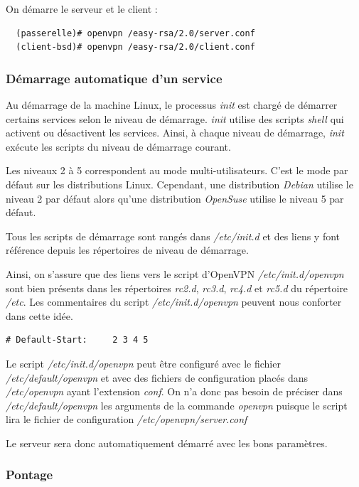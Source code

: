 \documentclass[a4paper]{article}
\begin{document}
On démarre le serveur et le client :
\begin{verbatim}
  (passerelle)# openvpn /easy-rsa/2.0/server.conf
  (client-bsd)# openvpn /easy-rsa/2.0/client.conf
\end{verbatim}

\subsubsection{Démarrage automatique d'un service}

Au démarrage de la machine Linux, le processus \textit{init} 
est chargé de démarrer certains services selon le niveau de démarrage.
\textit{init} utilise des scripts \textit{shell} qui activent ou désactivent
les services. Ainsi, à chaque niveau de démarrage, \textit{init} exécute
les scripts du niveau de démarrage courant.

Les niveaux 2 à 5 correspondent au mode multi-utilisateurs. C'est le mode
par défaut sur les distributions Linux. Cependant, une distribution 
\textit{Debian} utilise le niveau 2 par défaut alors qu'une distribution
\textit{OpenSuse} utilise le niveau 5 par défaut.

Tous les scripts de démarrage sont rangés dans \textit{/etc/init.d} et
des liens y font référence depuis les répertoires de niveau de démarrage.

Ainsi, on s'assure que des liens vers le script d'OpenVPN \textit{/etc/init.d/openvpn} 
sont bien présents dans les répertoires \textit{rc2.d}, \textit{rc3.d}, \textit{rc4.d} et
\textit{rc5.d} du répertoire \textit{/etc}.
Les commentaires du script \textit{/etc/init.d/openvpn} peuvent nous conforter dans
cette idée.
\begin{verbatim}
# Default-Start:     2 3 4 5
\end{verbatim}

Le script \textit{/etc/init.d/openvpn} peut être configuré 
avec le fichier \textit{/etc/default/openvpn} et avec des fichiers
de configuration placés dans \textit{/etc/openvpn} ayant l'extension \textit{conf}.
On n'a donc pas besoin de préciser dans \textit{/etc/default/openvpn} les
arguments de la commande \textit{openvpn} puisque le script lira 
le fichier de configuration \textit{/etc/openvpn/server.conf}

Le serveur sera donc automatiquement démarré avec les bons paramètres.

\subsubsection{Pontage}
\end{document}
